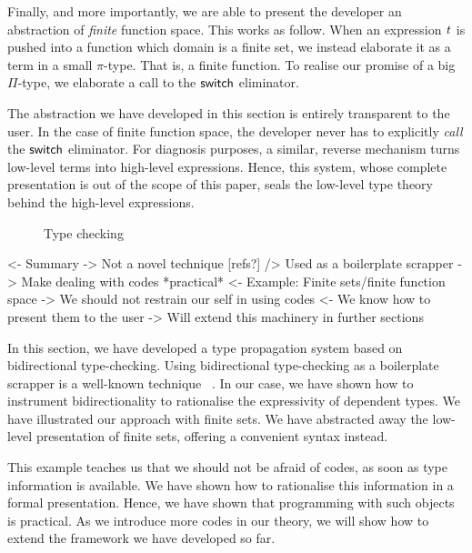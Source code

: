 Finally, and more importantly, we are able to present the developer an
abstraction of \emph{finite} function space. This works as follow. When
an expression $\V{t}$ is pushed into a function which domain is a finite
set, we instead elaborate it as a term in a small $\pi$-type. That is,
a finite function. To realise our promise of a big $\Pi$-type, we
elaborate a call to the $\F{switch}$ eliminator.

The abstraction we have developed in this section is entirely
transparent to the user. In the case of finite function space, the
developer never has to explicitly \emph{call} the $\F{switch}$
eliminator. For diagnosis purposes, a similar, reverse mechanism turns
low-level terms into high-level expressions. Hence, this system, whose
complete presentation is out of the scope of this paper, seals the
low-level type theory behind the high-level expressions.

\begin{figure}

\caption{Type checking}
\label{fig:type-checking}
\end{figure}

\begin{wstructure}
<- Summary
    -> Not a novel technique [refs?]
        /> Used as a boilerplate scrapper
    -> Make dealing with codes *practical*
        <- Example: Finite sets/finite function space
        -> We should not restrain our self in using codes
            <- We know how to present them to the user
-> Will extend this machinery in further sections
\end{wstructure}

In this section, we have developed a type propagation system based on
bidirectional type-checking. Using bidirectional type-checking as a
boilerplate scrapper is a well-known
technique~\cite{pierce:bidirectional-tc,
  xi:bidirectional-tc-bound-array, chlipala:strict-bidirectional-tc}
. In our case, we have shown
how to instrument bidirectionality to rationalise the expressivity of
dependent types. We have illustrated our approach with finite sets. We
have abstracted away the low-level presentation of finite sets,
offering a convenient syntax instead.

This example teaches us that we should not be afraid of codes, as soon
as type information is available. We have shown how to rationalise
this information in a formal presentation. Hence, we have shown that
programming with such objects is practical. As we introduce more codes
in our theory, we will show how to extend the framework we have
developed so far.
